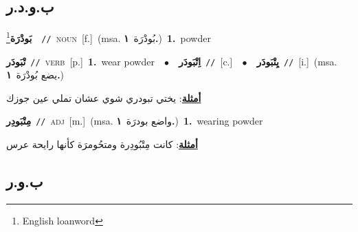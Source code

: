 \documentclass[10pt,a4paper,twoside]{article} %
\begin{document}
\begin{multicols}{2}
\vspace{-3mm}
\subsection*{\color{blue}\foreignlanguage{arabic}{ب.و.د.ر}\color{blue}{ (ntws)}} 

{\setlength\topsep{0pt}\textbf{\foreignlanguage{arabic}{بَودْرَة}}\footnote{English loanword}\ \ {\color{gray}\texttt{//}\color{black}}\ \textsc{noun}\ [f.]\ \color{gray}(msa. \foreignlanguage{arabic}{بُودْرَة}~\foreignlanguage{arabic}{\textbf{١.}})\color{black}\ \textbf{1.}~powder\ } \vspace{2mm}

{\setlength\topsep{0pt}\textbf{\foreignlanguage{arabic}{تْبَودَر}}\ {\color{gray}\texttt{//}\color{black}}\ \textsc{verb}\ [p.]\ \textbf{1.}~wear powder\ \ $\bullet$\ \ \setlength\topsep{0pt}\textbf{\foreignlanguage{arabic}{اِتْبَودَر}}\ {\color{gray}\texttt{//}\color{black}}\ [c.]\ \ $\bullet$\ \ \setlength\topsep{0pt}\textbf{\foreignlanguage{arabic}{يِتْبَودَر}}\ {\color{gray}\texttt{//}\color{black}}\ [i.]\ \color{gray}(msa. \foreignlanguage{arabic}{يضع بُودْرَة}~\foreignlanguage{arabic}{\textbf{١.}})\color{black}\  \begin{flushright}\color{gray}\foreignlanguage{arabic}{\textbf{\underline{\foreignlanguage{arabic}{أمثلة}}}: يختي تبودري شوي عشان تملي عين جوزك}\end{flushright}\color{black}} \vspace{2mm}

{\setlength\topsep{0pt}\textbf{\foreignlanguage{arabic}{مِتْبَودِر}}\ {\color{gray}\texttt{//}\color{black}}\ \textsc{adj}\ [m.]\ \color{gray}(msa. \foreignlanguage{arabic}{واضع بودرَة}~\foreignlanguage{arabic}{\textbf{١.}})\color{black}\ \textbf{1.}~wearing powder\  \begin{flushright}\color{gray}\foreignlanguage{arabic}{\textbf{\underline{\foreignlanguage{arabic}{أمثلة}}}: كانت مِتْبُودِرة ومتحُومرَة كأنها رايحة عرس}\end{flushright}\color{black}} \vspace{2mm}

\vspace{-3mm}
\subsection*{\color{blue}\foreignlanguage{arabic}{ب.و.ر}\color{blue}{}} 


\end{multicols}
\end{document}
